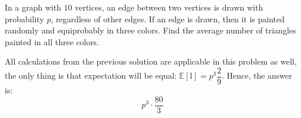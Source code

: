 \documentclass[12pt]{report}
\begin{document}
\begin{problem}{}
    In a graph with $10$ vertices, an edge between two vertices is drawn with
    probability $p$, regardless of other edges. If an edge is drawn, then it is painted
    randomly and equiprobably in three colors. Find the average number of triangles
    painted in all three colors.
\end{problem}
\begin{solution}
    All calculations from the previous solution are applicable in this problem as well, the only thing is that expectation will be equal: $\mathbb{E} [\mathbb{I}] = p^3 \dfrac{2}{9}$. Hence, the answer is:
    \[
        p^3 \cdot \dfrac{80}{3}    
    \]
\end{solution}
\end{document}
